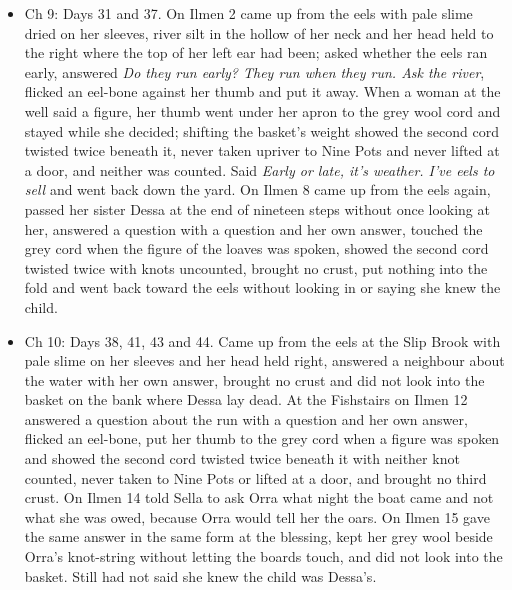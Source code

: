 \documentclass{design/chronicle}
\begin{document}
{\begin{itemize}[leftmargin=1.4em,itemsep=1pt,topsep=3pt,parsep=0pt]
\item Ch 9: Days 31 and 37. On Ilmen 2 came up from the eels with pale slime dried on her sleeves, river silt in the hollow of her neck and her head held to the right where the top of her left ear had been; asked whether the eels ran early, answered \emph{Do they run early? They run when they run. Ask the river}, flicked an eel-bone against her thumb and put it away. When a woman at the well said a figure, her thumb went under her apron to the grey wool cord and stayed while she decided; shifting the basket’s weight showed the second cord twisted twice beneath it, never taken upriver to Nine Pots and never lifted at a door, and neither was counted. Said \emph{Early or late, it’s weather. I’ve eels to sell} and went back down the yard. On Ilmen 8 came up from the eels again, passed her sister Dessa at the end of nineteen steps without once looking at her, answered a question with a question and her own answer, touched the grey cord when the figure of the loaves was spoken, showed the second cord twisted twice with knots uncounted, brought no crust, put nothing into the fold and went back toward the eels without looking in or saying she knew the child.

\end{itemize}

\begin{itemize}[leftmargin=1.4em,itemsep=1pt,topsep=3pt,parsep=0pt]

\item Ch 10: Days 38, 41, 43 and 44. Came up from the eels at the Slip Brook with pale slime on her sleeves and her head held right, answered a neighbour about the water with her own answer, brought no crust and did not look into the basket on the bank where Dessa lay dead. At the Fishstairs on Ilmen 12 answered a question about the run with a question and her own answer, flicked an eel-bone, put her thumb to the grey cord when a figure was spoken and showed the second cord twisted twice beneath it with neither knot counted, never taken to Nine Pots or lifted at a door, and brought no third crust. On Ilmen 14 told Sella to ask Orra what night the boat came and not what she was owed, because Orra would tell her the oars. On Ilmen 15 gave the same answer in the same form at the blessing, kept her grey wool beside Orra’s knot-string without letting the boards touch, and did not look into the basket. Still had not said she knew the child was Dessa’s.

\end{itemize}

}
\end{document}
